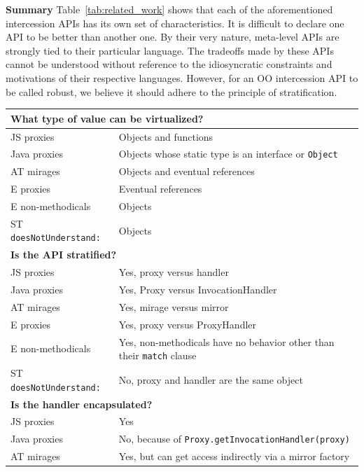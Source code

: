 \documentclass{sig-alternate}
\begin{document}
\textbf{Summary} Table~\ref{tab:related_work} shows that each of the aforementioned intercession APIs has its own set of characteristics. It is difficult to declare one API to be better than another one. By their very nature, meta-level APIs are strongly tied to their particular language. The tradeoffs made by these APIs cannot be understood without reference to the idiosyncratic constraints and motivations of their respective languages. However, for an OO intercession API to be called robust, we believe it should adhere to the principle of stratification.

\begin{table}
\centering
\begin{tabular}{|p{}|p{}|}
    \hline
    \multicolumn{2}{|l|}{\textbf{What type of value can be virtualized?}}\\
    \hline
    JS proxies        & Objects and functions\\
    Java proxies      & Objects whose static type is an interface or \texttt{Object}\\
    AT mirages        & Objects and eventual references\\
    E proxies         & Eventual references\\
    E non-methodicals & Objects\\
    ST \texttt{doesNotUnderstand:}  & Objects\\
    \hline
    \multicolumn{2}{|l|}{\textbf{Is the API stratified?}}\\
    \hline
    JS proxies        & Yes, proxy versus handler\\
    Java proxies      & Yes, Proxy versus InvocationHandler\\
    AT mirages        & Yes, mirage versus mirror\\
    E proxies         & Yes, proxy versus ProxyHandler\\
    E non-methodicals & Yes, non-methodicals have no behavior other than their \texttt{match} clause\\
    ST \texttt{doesNotUnderstand:}  & No, proxy and handler are the same object\\
    \hline
    \multicolumn{2}{|l|}{\textbf{Is the handler encapsulated?}}\\
    \hline
    JS proxies        & Yes\\
    Java proxies      & No, because of \texttt{Proxy.getInvocationHandler(proxy)}\\
    AT mirages        & Yes, but can get access indirectly via a mirror factory\\

\end{tabular}
\end{table}
\end{document}
